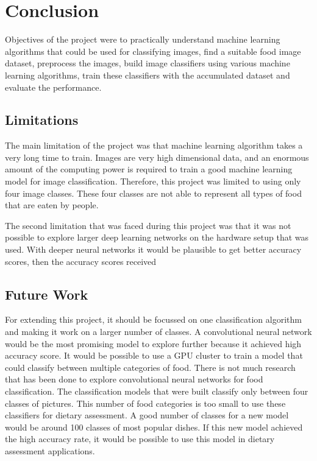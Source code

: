 \chapter{Conclusion}



Objectives of the project were to practically understand machine learning algorithms that could be used for classifying images, find a suitable food image dataset, preprocess the images, build image classifiers using various machine learning algorithms, train these classifiers with the accumulated dataset and evaluate the performance.

\section{Limitations}
The main limitation of the project was that machine learning algorithm takes a very long time to train. Images are very high dimensional data, and an enormous amount of the computing power is required to train a good machine learning model for image classification. Therefore, this project was limited to using only four image classes.  These four classes are not able to represent all types of food that are eaten by people.

The second limitation that was faced during this project was that it was not possible to explore larger deep learning networks on the hardware setup that was used. With deeper  neural networks it would be plausible to get  better  accuracy scores, then the accuracy scores received

\section{Future Work}

For extending this project, it should be focussed on one classification algorithm and making it work on a larger number of classes.  A convolutional neural network would be the most promising model to explore further because it achieved high accuracy score.  It would be possible to use a GPU cluster to train a model that could classify between multiple categories of food. There is not much research that has been done to explore convolutional neural networks for food classification. The classification models that were built classify only between four classes of pictures. This number of food categories is too small to use these classifiers for dietary assessment.  A good number of classes for a new model would be around 100 classes of most popular dishes. If this new model achieved the high accuracy rate, it would be possible to use this model in dietary assessment applications.

